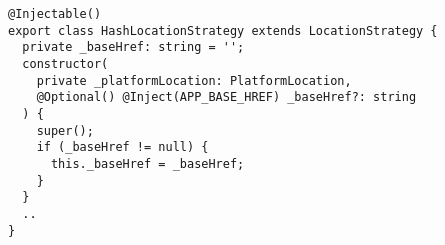 \begin{verbatim}
@Injectable()
export class HashLocationStrategy extends LocationStrategy {
  private _baseHref: string = '';
  constructor(
    private _platformLocation: PlatformLocation,
    @Optional() @Inject(APP_BASE_HREF) _baseHref?: string
  ) {
    super();
    if (_baseHref != null) {
      this._baseHref = _baseHref;
    }
  }
  ..
}
\end{verbatim}
